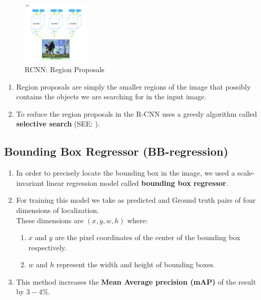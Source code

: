 \begin{table}[H]
    \begin{minipage}[t]{0.49\linewidth}
        \begin{figure}[H]
            \centering
            \includegraphics[width=\linewidth, height=3cm, keepaspectratio]{Pictures/convolutional-neural-network/rcnn-region-proposals.jpg}
            \caption{RCNN: Region Proposals}
        \end{figure}        
    \end{minipage}
    \hfill
    \begin{minipage}[t]{0.49\linewidth}
        \begin{enumerate}
            \item Region proposals are simply the smaller regions of the image that possibly contains the objects we are searching for in the input image.
        
            \item To reduce the region proposals in the R-CNN uses a greedy algorithm called \textbf{selective search} (SEE: ).
        \end{enumerate}
    \end{minipage}
\end{table}


\subsection{Bounding Box Regressor (BB-regression) \cite{https://www.geeksforgeeks.org/r-cnn-region-based-cnns/}}\label{Bounding Box Regressor (BB-regression)}

\begin{enumerate}
    \item In order to precisely locate the bounding box in the image, we used a scale-invariant linear regression model called \textbf{bounding box regressor}.

    \item For training this model we take as predicted and Ground truth pairs of four dimensions of localization.\\
    These dimensions are $(x, y, w, h)$ where:
    \begin{enumerate}
        \item $x$ and $y$ are the pixel coordinates of the center of the bounding box respectively. 

        \item $w$ and $h$ represent the width and height of bounding boxes.
    \end{enumerate}
    
    \item This method increases the \textbf{Mean Average precision (mAP)} of the result by $3-4\%$.
    
\end{enumerate}



